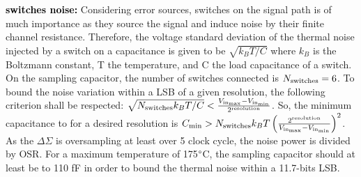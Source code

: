 
\textbf{\textcolor{black}{switches noise:}}
Considering error sources, switches on the signal path is of much importance as they source the signal and induce noise by their finite channel resistance. 
Therefore, the voltage standard deviation of the thermal noise injected by a switch on a capacitance is given to be \(\sqrt{k_BT/C} \) where \(k_B\) is the Boltzmann constant, T the temperature, and C the load capacitance of a switch. On the sampling capacitor, the number of switches connected is $N_{\rm switches} = 6$. To bound the noise variation within a LSB of a given resolution, the following criterion shall be respected: $\sqrt{N_{\rm switches} k_BT/C} < \frac{V_{\rm in_{\max}}-V_{\rm in_{\min}}}{2^{\rm resolution}}$. So, the minimum capacitance to for a desired resolution is $C_{\min} > N_{\rm switches} k_BT \left(\frac{2^{\rm resolution}}{V_{\rm in_{\max}}-V_{\rm in_{\min}}} \right)^2$. As the $\Delta\Sigma$ is oversampling at least over 5 clock cycle, the noise power is divided by OSR\@. For a maximum temperature of 175\(\degree \)C, the sampling capacitor should at least be to 110 fF in order to bound the thermal noise within a 11.7-bits LSB\@.

